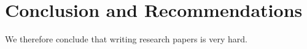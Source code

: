 \chapter{Conclusion and Recommendations}

We therefore conclude that writing research papers is very hard.

\lipsum[3]
